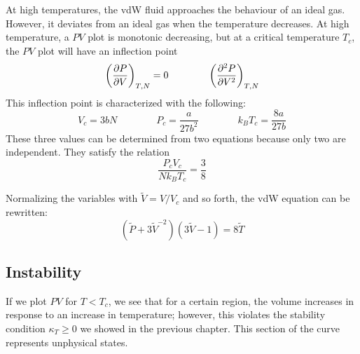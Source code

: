 At high temperatures, the vdW fluid approaches the behaviour of an ideal gas. However, it deviates from an ideal gas when the temperature decreases. At high temperature, a \(PV\) plot is monotonic decreasing, but at a critical temperature \(T_c\), the \(PV\) plot will have an inflection point
\[\left(\frac{\partial P}{\partial V}\right)_{T,N}=0 \qquad \qquad \left(\frac{\partial ^2P}{\partial V^2}\right)_{T,N}\]
This inflection point is characterized with the following:
\begin{equation}
	V_c = 3bN \qquad \qquad P_c=\frac{a}{27b^2} \qquad \qquad k_B T_c = \frac{8a}{27b}
\end{equation}
These three values can be determined from two equations because only two are independent. They satisfy the relation
\begin{equation}
	\frac{P_cV_c}{Nk_BT_c}=\frac{3}{8}
\end{equation}

Normalizing the variables with \(\tilde V = V/V_c\) and so forth, the vdW equation can be rewritten:
\begin{equation}
	\left(\tilde P + 3\tilde {V}^{-2}\right)\left(3\tilde V -1\right) = 8\tilde T
\end{equation}

\break{}

\subsection{Instability}
If we plot \(PV\) for \(T<T_c\), we see that for a certain region, the volume increases in response to an increase in temperature; however, this violates the stability condition \(\kappa_T\geq 0\) we showed in the previous chapter. This section of the curve represents unphysical states. 

